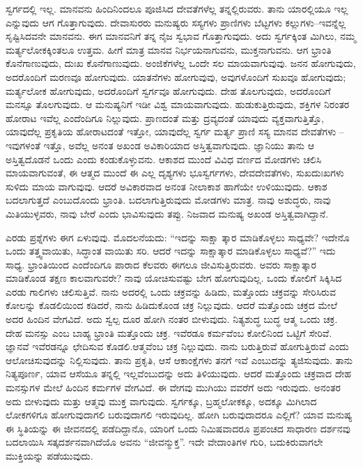 ಸ್ವರ್ಗದಲ್ಲಿ ಇಲ್ಲ. ಮಾನವನು ಹಿಂದಿನಿಂದಲೂ ಪೂಜಿಸಿದ ದೇವತೆಗಳೆಲ್ಲ ತನ್ನಲ್ಲಿರುವರು. ತಾನು ಯಾರಲ್ಲಿಯೂ ಇಲ್ಲ ಎನ್ನುವುದು ಆಗ ಗೊತ್ತಾಗುವುದು. ದೇವಾಸುರರು ಮನುಷ್ಯರು ಸಸ್ಯಗಳು ಪ್ರಾಣಿಗಳು ಬೆಟ್ಟಗಳು ಕಲ್ಲುಗಳು–ಇವನ್ನೆಲ್ಲ ಸೃಷ್ಟಿಸಿದವನೇ ಮಾನವನು. ಈಗ ಮಾನವನಿಗೆ ತನ್ನ ನೈಜ ಸ್ವಭಾವ ಗೊತ್ತಾಗುವುದು. ಅದು ಸ್ವರ್ಗಕ್ಕಿಂತ ಮಿಗಿಲು, ನಮ್ಮ ಮರ್ತ್ಯಲೋಕಕ್ಕಿಂತಲೂ ಉತ್ತಮ. ಹೀಗೆ ಮಾತ್ರ ಮಾನವ ನಿರ್ಭಯನಾಗುವನು, ಮುಕ್ತನಾಗುವನು. ಆಗ ಭ್ರಾಂತಿ ಕೊನೆಗಾಣುವುದು, ದುಃಖ ಕೊನೆಗಾಣುವುದು. ಅಂಜಿಕೆಗಳೆಲ್ಲ ಒಂದೇ ಸಲ ಮಾಯವಾಗುವುವು. ಜನನ ಹೋಗುವುದು, ಅದರೊಂದಿಗೆ ಮರಣವೂ ಹೋಗುವುದು. ಯಾತನೆಗಳು ಹೋಗುವುವು, ಅವುಗಳೊಂದಿಗೆ ಸುಖವೂ ಹೋಗುವುದು; ಮರ್ತ್ಯಲೋಕ ಹೋಗುವುದು, ಅದರೊಂದಿಗೆ ಸ್ವರ್ಗವೂ ಹೋಗುವುದು. ದೇಹ ತೊಲಗುವುದು, ಅದರೊಂದಿಗೆ ಮನಸ್ಸೂ ತೊಲಗುವುದು. ಆ ಮನುಷ್ಯನಿಗೆ ಇಡೀ ವಿಶ್ವ ಮಾಯವಾಗುವುದು. ಹುಡುಕುತ್ತಿರುವುದು, ಶಕ್ತಿಗಳ ನಿರಂತರ ಹೋರಾಟ ಇವೆಲ್ಲ ಎಂದೆಂದಿಗೂ ನಿಲ್ಲುವುದು. ಪ್ರಾಣದಂತೆ ಮತ್ತು ದ್ರವ್ಯದಂತೆ ಯಾವುದು ವ್ಯಕ್ತವಾಗುತ್ತಿತ್ತೊ, ಯಾವುದೆಲ್ಲ ಪ್ರಕೃತಿಯ ಹೋರಾಟದಂತೆ ಇತ್ತೋ, ಯಾವುದೆಲ್ಲ ಸ್ವರ್ಗ ಮರ್ತ್ಯ ಪ್ರಾಣಿ ಸಸ್ಯ ಮಾನವ ದೇವತೆಗಳು – ಇವುಗಳಂತೆ ಇತ್ತೊ, ಅವೆಲ್ಲ ಅನಂತ ಅಖಂಡ ಅವಿಕಾರಿಯಾದ ಅಸ್ತಿತ್ವವಾಗುವುದು. ಜ್ಞಾನಿಯು ತಾನು ಆ ಅಸ್ತಿತ್ವದೊಡನೆ ಒಂದು ಎಂದು ಕಂಡುಕೊಳ್ಳುವನು. ಆಕಾಶದ ಮುಂದೆ ವಿವಿಧ ವರ್ಣದ ಮೋಡಗಳು ಚಲಿಸಿ ಮಾಯವಾಗುವಂತೆ, ಈ ಆತ್ಮದ ಮುಂದೆ ಈ ಎಲ್ಲ ದೃಶ್ಯಗಳು ಭೂಸ್ವರ್ಗಗಳು, ದೇವದೇವತೆಗಳು, ಸುಖದುಃಖಗಳು ಸುಳಿದು ಮಾಯ ವಾಗುವುವು. ಆದರೆ ಅವಿಕಾರವಾದ ಅನಂತ ನೀಲಾಕಾಶ ಹಾಗೆಯೇ ಉಳಿಯುವುದು. ಆಕಾಶ ಬದಲಾಗುತ್ತದೆ ಎಂಬುದೊಂದು ಭ್ರಾಂತಿ. ಬದಲಾಗುತ್ತಿರುವುದು ಮೋಡಗಳು ಮಾತ್ರ. ನಾವು ಅಶುದ್ಧರು, ನಾವು ಮಿತಿಯುಳ್ಳವರು, ನಾವು ಬೇರೆ ಎಂದು ಭಾವಿಸುವುದು ತಪ್ಪು. ನಿಜವಾದ ಮನುಷ್ಯ ಅಖಂಡ ಅಸ್ತಿತ್ವವಾಗಿದ್ದಾನೆ.

ಎರಡು ಪ್ರಶ್ನೆಗಳು ಈಗ ಏಳುವುವು. ಮೊದಲನೆಯದು: “ಇದನ್ನು ಸಾಕ್ಷಾ ತ್ಕಾರ ಮಾಡಿಕೊಳ್ಳಲು ಸಾಧ್ಯವೇ? ಇದೇನೊ ಒಂದು ತತ್ತ್ವವಾಯಿತು, ಸಿದ್ಧಾಂತ ವಾಯಿತು ಸರಿ. ಆದರೆ ಇದನ್ನು ಸಾಕ್ಷಾತ್ಕಾರ ಮಾಡಿಕೊಳ್ಳಲು ಸಾಧ್ಯವೆ?” ಇದು ಸಾಧ್ಯ. ಭ್ರಾಂತಿಯಿಂದ ಎಂದೆಂದಿಗೂ ಪಾರಾದ ಕೆಲವರು ಈಗಲೂ ಜೀವಿಸುತ್ತಿರುವರು. ಅವರು ಸಾಕ್ಷಾತ್ಕಾರ ಮಾಡಿಕೊಂಡ ತಕ್ಷಣ ಕಾಲವಾಗುವರೇ? ನಾವು ಯೋಚಿಸುವಷ್ಟು ಬೇಗ ಹೋಗುವುದಿಲ್ಲ. ಒಂದು ಕೋಲಿಗೆ ಸಿಕ್ಕಿಸಿದ ಎರಡು ಗಾಲಿಗಳು ಚಲಿಸುತ್ತಿವೆ. ನಾನು ಅದರಲ್ಲಿ ಒಂದು ಚಕ್ರವನ್ನು ಹಿಡಿದು, ಮತ್ತೊಂದು ಚಕ್ರವನ್ನು ಸೇರಿಸಿರುವ ಕೋಲನ್ನು ಕೊಡಲಿಯಿಂದ ಕಡಿದರೆ, ನಾನು ಹಿಡಿದುಕೊಂಡ ಚಕ್ರ ನಿಲ್ಲುವುದು. ಆದರೆ ಮತ್ತೊಂದು ಚಕ್ರದ ಮೇಲೆ ಅದರ ಹಿಂದಿನ ವೇಗವಿದೆ. ಅದು ಸ್ವಲ್ಪ ದೂರ ಹೋಗಿ ನಂತರ ಬೀಳುವುದು. ನಿತ್ಯಶುದ್ಧ ಬುದ್ಧ ಆತ್ಮ ಒಂದು ಚಕ್ರ. ದೇಹ ಮನಸ್ಸು ಎಂಬ ಬಾಹ್ಯ ಭ್ರಾಂತಿ ಮತ್ತೊಂದು ಚಕ್ರ. ಇವೆರಡೂ ಕರ್ಮವೆಂಬ ಕೋಲಿನಿಂದ ಒಟ್ಟಿಗೆ ಸೇರಿವೆ. ಜ್ಞಾನವೆ ಇವೆರಡನ್ನೂ ಛೇದಿಸುವ ಕೊಡಲಿ.ಆತ್ಮವೆಂಬ ಚಕ್ರ ನಿಲ್ಲುವುದು. ನಾನು ಬರುತ್ತಿರುವೆ ಹೋಗುತ್ತಿರುವೆ ಎಂದು ಆಲೋಚಿಸುವುದನ್ನು ನಿಲ್ಲಿಸುವುದು. ತಾನು ಪ್ರಕೃತಿ, ಆಸೆ ಆಕಾಂಕ್ಷೆಗಳು ತನಗೆ ಇವೆ ಎಂಬುದನ್ನು ತ್ಯಜಿಸುವುದು. ತಾನು ನಿತ್ಯಪೂರ್ಣ, ಯಾವ ಆಸೆಯೂ ತನ್ನಲ್ಲಿ ಇಲ್ಲವೆಂಬುದನ್ನು ಅದು ತಿಳಿಯುವುದು. ಆದರೆ ಮತ್ತೊಂದು ಚಕ್ರವಾದ ದೇಹ ಮನಸ್ಸುಗಳ ಮೇಲೆ ಹಿಂದಿನ ಕರ್ಮಗಳ ವೇಗವಿದೆ. ಈ ವೇಗವು ಮುಗಿಯು ವವರೆಗೆ ಅದು ಇರುವುದು. ಅನಂತರ ಅದು ಬೀಳುವುದು ಮತ್ತು ಆತ್ಮವು ಮುಕ್ತ ವಾಗುವುದು. ಸ್ವರ್ಗಕ್ಕೂ, ಬ್ರಹ್ಮಲೋಕಕ್ಕೂ, ಅದಕ್ಕೂ ಮಿಗಿಲಾದ ಲೋಕಗಳಿಗೂ ಹೋಗುವುದಾಗಲಿ ಬರುವುದಾಗಲಿ ಇರುವುದಿಲ್ಲ. ಹೋಗಿ ಬರುವುದಾದರೂ ಎಲ್ಲಿಗೆ? ಯಾವ ಮನುಷ್ಯ ಈ ಸ್ಥಿತಿಯನ್ನು ಈ ಜೀವನದಲ್ಲಿ ಪಡೆದಿದ್ದಾನೊ, ಯಾರಿಗೆ ಒಂದು ನಿಮಿಷವಾದರೂ ಪ್ರಪಂಚದ ಸಾಧಾರಣ ದರ್ಶನವು ಬದಲಾಯಿಸಿ ಸತ್ಕದರ್ಶನವಾಗಿದೆಯೊ ಅವನು “ಜೀವನ್ಮುಕ್ತ”. ಇದೇ ವೇದಾಂತಿಗಳ ಗುರಿ, ಬದುಕಿರುವಾಗಲೇ ಮುಕ್ತಿಯನ್ನು ಪಡೆಯುವುದು.

